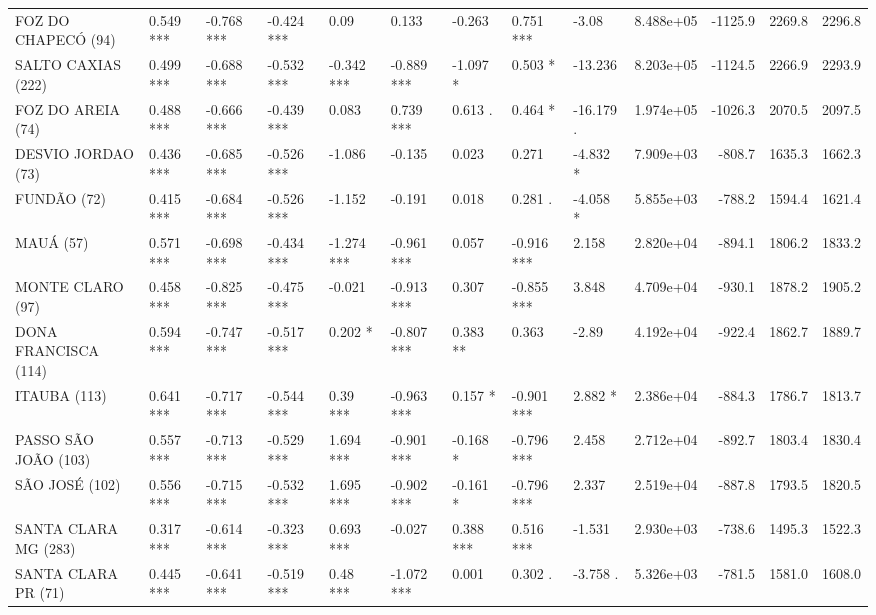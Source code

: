 \documentclass[12pt,oneside]{book}\usepackage[]{graphicx}\usepackage[]{color}
\newenvironment{knitrout}{}{} %
\theoremstyle{definition} %
\begin{document}
\begin{knitrout}
\begin{landscape}
\begin{table}
{\begin{tabular}[t]{lllllllllrrrr}
\addlinespace
FOZ DO CHAPECÓ (94) & 0.549 *** & -0.768 *** & -0.424 *** & 0.09 & 0.133 & -0.263 & 0.751 *** & -3.08 & 8.488e+05 & -1125.9 & 2269.8 & 2296.8\\
\rowcolor{gray!6}  SALTO CAXIAS (222) & 0.499 *** & -0.688 *** & -0.532 *** & -0.342 *** & -0.889 *** & -1.097 * & 0.503 * & -13.236 & 8.203e+05 & -1124.5 & 2266.9 & 2293.9\\
FOZ DO AREIA (74) & 0.488 *** & -0.666 *** & -0.439 *** & 0.083 & 0.739 *** & 0.613 . & 0.464 * & -16.179 . & 1.974e+05 & -1026.3 & 2070.5 & 2097.5\\
\rowcolor{gray!6}  DESVIO JORDAO (73) & 0.436 *** & -0.685 *** & -0.526 *** & -1.086 & -0.135 & 0.023 & 0.271 & -4.832 * & 7.909e+03 & -808.7 & 1635.3 & 1662.3\\
FUNDÃO (72) & 0.415 *** & -0.684 *** & -0.526 *** & -1.152 & -0.191 & 0.018 & 0.281 . & -4.058 * & 5.855e+03 & -788.2 & 1594.4 & 1621.4\\
\addlinespace
\rowcolor{gray!6}  MAUÁ (57) & 0.571 *** & -0.698 *** & -0.434 *** & -1.274 *** & -0.961 *** & 0.057 & -0.916 *** & 2.158 & 2.820e+04 & -894.1 & 1806.2 & 1833.2\\
MONTE CLARO (97) & 0.458 *** & -0.825 *** & -0.475 *** & -0.021 & -0.913 *** & 0.307 & -0.855 *** & 3.848 & 4.709e+04 & -930.1 & 1878.2 & 1905.2\\
\rowcolor{gray!6}  DONA FRANCISCA (114) & 0.594 *** & -0.747 *** & -0.517 *** & 0.202 * & -0.807 *** & 0.383 ** & 0.363 & -2.89 & 4.192e+04 & -922.4 & 1862.7 & 1889.7\\
ITAUBA (113) & 0.641 *** & -0.717 *** & -0.544 *** & 0.39 *** & -0.963 *** & 0.157 * & -0.901 *** & 2.882 * & 2.386e+04 & -884.3 & 1786.7 & 1813.7\\
\rowcolor{gray!6}  PASSO SÃO JOÃO (103) & 0.557 *** & -0.713 *** & -0.529 *** & 1.694 *** & -0.901 *** & -0.168 * & -0.796 *** & 2.458 & 2.712e+04 & -892.7 & 1803.4 & 1830.4\\
\addlinespace
SÃO JOSÉ (102) & 0.556 *** & -0.715 *** & -0.532 *** & 1.695 *** & -0.902 *** & -0.161 * & -0.796 *** & 2.337 & 2.519e+04 & -887.8 & 1793.5 & 1820.5\\
\rowcolor{gray!6}  SANTA CLARA MG (283) & 0.317 *** & -0.614 *** & -0.323 *** & 0.693 *** & -0.027 & 0.388 *** & 0.516 *** & -1.531 & 2.930e+03 & -738.6 & 1495.3 & 1522.3\\
SANTA CLARA PR (71) & 0.445 *** & -0.641 *** & -0.519 *** & 0.48 *** & -1.072 *** & 0.001 & 0.302 . & -3.758 . & 5.326e+03 & -781.5 & 1581.0 & 1608.0\\

\end{tabular}}
\end{table}
\end{landscape}
\end{knitrout}
\end{document}
